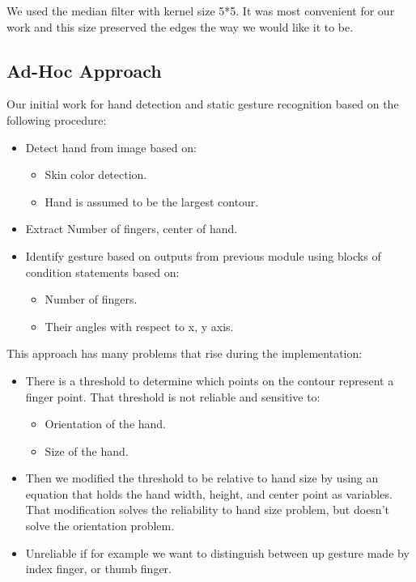 We used the median filter with kernel size 5*5. It was most convenient for our work and 
this size preserved the edges the way we would like it to be. 

\subsection{Ad-Hoc Approach }
Our initial work for hand detection and static gesture recognition based on the following procedure:\bigskip


\begin{itemize}
\item Detect hand from image based on:
\begin{itemize}
\item Skin color detection.
\item Hand is assumed to be the largest contour.
\end{itemize}
\item Extract Number of fingers, center of hand.
\item Identify gesture based on outputs from previous module using blocks of condition statements based on:
\begin{itemize}
\item Number of fingers.
\item Their angles with respect to x, y axis.
\end{itemize}
\end{itemize}
\bigskip

This approach has many problems that rise during the implementation:\bigskip


\begin{itemize}
\item There is a threshold to determine which points on the contour represent a finger point. That threshold is not reliable and sensitive to:
\begin{itemize}
\item Orientation of the hand.
\item Size of the hand.
\end{itemize}
\item Then we modified the threshold to be relative to hand size by using an equation that holds the hand width, height, and center point as variables.
That modification solves the reliability to hand size problem, but doesn’t solve the orientation problem.
\item Unreliable if for example we want to distinguish between up gesture made by index finger, or thumb finger.
\end{itemize}
\bigskip

